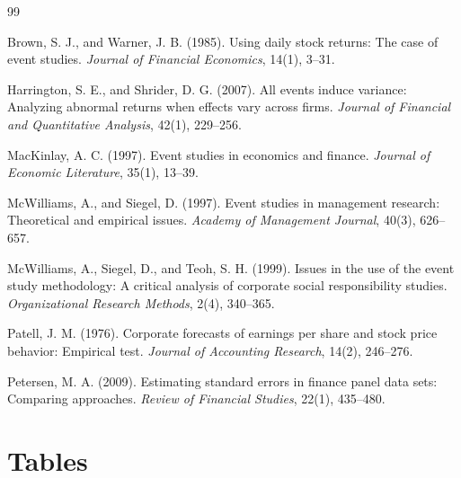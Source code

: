\documentclass[11pt]{article}
\begin{document}
\begin{thebibliography}{99}
\setlength{\itemsep}{0pt}
\small

Brown, S. J., and Warner, J. B. (1985). Using daily stock returns: The case of event studies. \textit{Journal of Financial Economics}, 14(1), 3--31.

Harrington, S. E., and Shrider, D. G. (2007). All events induce variance: Analyzing abnormal returns when effects vary across firms. \textit{Journal of Financial and Quantitative Analysis}, 42(1), 229--256.

MacKinlay, A. C. (1997). Event studies in economics and finance. \textit{Journal of Economic Literature}, 35(1), 13--39.

McWilliams, A., and Siegel, D. (1997). Event studies in management research: Theoretical and empirical issues. \textit{Academy of Management Journal}, 40(3), 626--657.

McWilliams, A., Siegel, D., and Teoh, S. H. (1999). Issues in the use of the event study methodology: A critical analysis of corporate social responsibility studies. \textit{Organizational Research Methods}, 2(4), 340--365.

Patell, J. M. (1976). Corporate forecasts of earnings per share and stock price behavior: Empirical test. \textit{Journal of Accounting Research}, 14(2), 246--276.

Petersen, M. A. (2009). Estimating standard errors in finance panel data sets: Comparing approaches. \textit{Review of Financial Studies}, 22(1), 435--480.

\end{thebibliography}

\clearpage
\section*{Tables}
\end{document}
